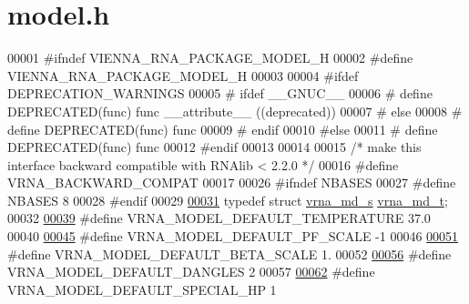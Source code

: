 \hypertarget{model_8h_source}{}\section{model.\+h}
\label{model_8h_source}

\begin{DoxyCode}
00001 \textcolor{preprocessor}{#ifndef VIENNA\_RNA\_PACKAGE\_MODEL\_H}
00002 \textcolor{preprocessor}{#define VIENNA\_RNA\_PACKAGE\_MODEL\_H}
00003 
00004 \textcolor{preprocessor}{#ifdef DEPRECATION\_WARNINGS}
00005 \textcolor{preprocessor}{# ifdef \_\_GNUC\_\_}
00006 \textcolor{preprocessor}{#  define DEPRECATED(func) func \_\_attribute\_\_ ((deprecated))}
00007 \textcolor{preprocessor}{# else}
00008 \textcolor{preprocessor}{#  define DEPRECATED(func) func}
00009 \textcolor{preprocessor}{# endif}
00010 \textcolor{preprocessor}{#else}
00011 \textcolor{preprocessor}{# define DEPRECATED(func) func}
00012 \textcolor{preprocessor}{#endif}
00013 
00014 
00015 \textcolor{comment}{/* make this interface backward compatible with RNAlib < 2.2.0 */}
00016 \textcolor{preprocessor}{#define VRNA\_BACKWARD\_COMPAT}
00017 
00026 \textcolor{preprocessor}{#ifndef NBASES}
00027 \textcolor{preprocessor}{#define NBASES 8}
00028 \textcolor{preprocessor}{#endif}
00029 
\hypertarget{model_8h_source.tex_l00031}{}\hyperlink{group__model__details_ga1f8a10e12a0a1915f2a4eff0b28ea17c}{00031} \textcolor{keyword}{typedef} \textcolor{keyword}{struct }\hyperlink{group__model__details_structvrna__md__s}{vrna\_md\_s}  \hyperlink{group__model__details_structvrna__md__s}{vrna\_md\_t};
00032 
\hypertarget{model_8h_source.tex_l00039}{}\hyperlink{group__model__details_gaf47f9850b3b4763479f7a7e7a15648a2}{00039} \textcolor{preprocessor}{#define VRNA\_MODEL\_DEFAULT\_TEMPERATURE    37.0}
00040 
\hypertarget{model_8h_source.tex_l00045}{}\hyperlink{group__model__details_ga5505389cba74a18bbc116d2bb20256fa}{00045} \textcolor{preprocessor}{#define VRNA\_MODEL\_DEFAULT\_PF\_SCALE       -1}
00046 
\hypertarget{model_8h_source.tex_l00051}{}\hyperlink{group__model__details_ga383d3ac8d08c3b6221754b50871c1200}{00051} \textcolor{preprocessor}{#define VRNA\_MODEL\_DEFAULT\_BETA\_SCALE     1.}
00052 
\hypertarget{model_8h_source.tex_l00056}{}\hyperlink{group__model__details_ga2aa7bc2cae774b83a5c468f824c27a42}{00056} \textcolor{preprocessor}{#define VRNA\_MODEL\_DEFAULT\_DANGLES        2}
00057 
\hypertarget{model_8h_source.tex_l00062}{}\hyperlink{group__model__details_gabd1ab224e1048defd45c165ed7d1c108}{00062} \textcolor{preprocessor}{#define VRNA\_MODEL\_DEFAULT\_SPECIAL\_HP     1}

\end{DoxyCode}
